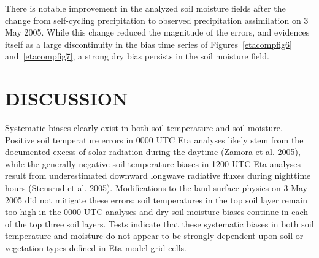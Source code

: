 \documentclass[twocolumn]{article}
\begin{document}
There is notable improvement in the analyzed soil moisture fields after the change from self-cycling precipitation to observed precipitation assimilation on 3 May 2005.  While this change reduced the magnitude of the errors, and evidences itself as a large discontinuity in the bias time series of Figures~\ref{etacompfig6} and~\ref{etacompfig7}, a strong dry bias persists in the soil moisture field.

\section{{\normalsize \hspace{-0.195in} {\textbf{
DISCUSSION
}}}} \vspace{-1.6mm}
\label{etacomp_disc.sec}
Systematic biases clearly exist in both soil temperature and soil moisture.  Positive soil temperature errors in 0000 UTC Eta analyses likely stem from the documented excess of solar radiation during the daytime (Zamora et al. 2005), while the generally negative soil temperature biases in 1200 UTC Eta analyses result from underestimated downward longwave radiative fluxes during nighttime hours (Stensrud et al. 2005).  Modifications to the land surface physics on 3 May 2005 did not mitigate these errors; soil temperatures in the top soil layer remain too high in the 0000 UTC analyses and dry soil moisture biases continue in each of the top three soil layers.  Tests indicate that these systematic biases in both soil temperature and moisture do not appear to be strongly dependent upon soil or vegetation types defined in Eta model grid cells.
\end{document}
